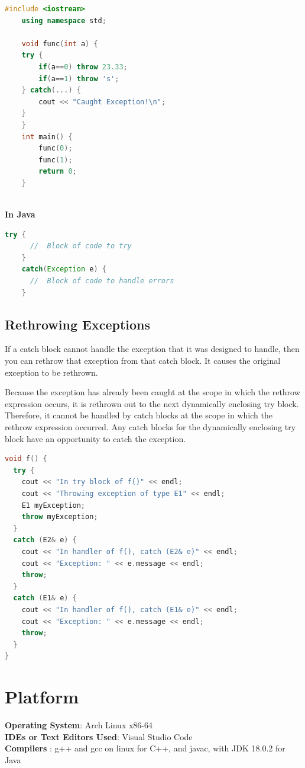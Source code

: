 \documentclass[11pt]{article}
\begin{document}
\begin{lstlisting}[language=C++]
	#include <iostream>
	using namespace std;

	void func(int a) {
	try {
		if(a==0) throw 23.33;
		if(a==1) throw 's';
	} catch(...) {
		cout << "Caught Exception!\n";
	}
	}
	int main() {
		func(0);
		func(1);
		return 0;
	}
	
\end{lstlisting}
\textbf{In Java}
\begin{lstlisting}[language=Java]
	try {
	  //  Block of code to try
	}
	catch(Exception e) {
	  //  Block of code to handle errors
	}	
\end{lstlisting}

\subsection{Rethrowing Exceptions}
If a catch block cannot handle the exception that it was designed to handle, then you can rethrow that exception from that catch block.
It causes the original exception to be rethrown.

Because the exception has already been caught at the scope in which the rethrow expression occurs, it is rethrown out to the next dynamically enclosing try block. Therefore, it cannot be handled by catch blocks at the scope in which the rethrow expression occurred. Any catch blocks for the dynamically enclosing try block have an opportunity to catch the exception.
\begin{lstlisting}[language=C++]
void f() {
  try {
	cout << "In try block of f()" << endl;
	cout << "Throwing exception of type E1" << endl;
	E1 myException;
	throw myException;
  }
  catch (E2& e) {
	cout << "In handler of f(), catch (E2& e)" << endl;
	cout << "Exception: " << e.message << endl;
	throw;
  }
  catch (E1& e) {
	cout << "In handler of f(), catch (E1& e)" << endl;
	cout << "Exception: " << e.message << endl;
	throw;
  }	
}

\end{lstlisting}
\section{Platform}
\textbf{Operating System}: Arch Linux x86-64 \\
\textbf{IDEs or Text Editors Used}: Visual Studio Code\\
\textbf{Compilers} : g++ and gcc on linux for C++, and javac, with JDK 18.0.2 for Java\\
\end{document}

